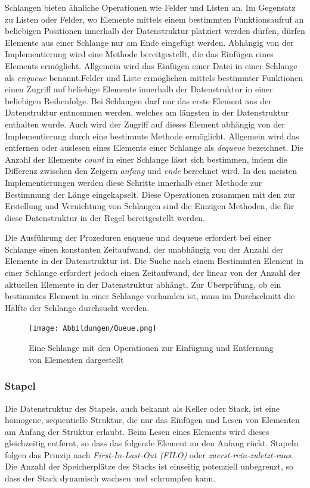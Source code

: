 Schlangen bieten ähnliche Operationen wie Felder und Listen an. Im Gegensatz zu Listen oder Felder, wo Elemente mittels einem bestimmten Funktionsaufruf an beliebigen Positionen innerhalb der Datenstruktur platziert werden dürfen, dürfen Elemente aus einer Schlange nur am Ende eingefügt werden. Abhängig von der Implementierung wird eine Methode bereitgestellt, die das Einfügen eines Elements ermöglicht. Allgemein wird das Einfügen einer Datei in einer Schlange als \textit{enqueue} benannt.Felder und Liste ermöglichen mittels bestimmter Funktionen einen Zugriff auf beliebige Elemente innerhalb der Datenstruktur in einer beliebigen Reihenfolge. Bei Schlangen darf nur das erste Element aus der Datenstruktur entnommen werden, welches am längsten in der Datenstruktur enthalten wurde. Auch wird der Zugriff auf dieses Element abhängig von der Implementierung durch eine bestimmte Methode ermöglicht. Allgemein wird das entfernen oder auslesen eines Elements einer Schlange als \textit{dequeue} bezeichnet. Die Anzahl der Elemente \textit{count} in einer Schlange lässt sich bestimmen, indem die Differenz zwischen den Zeigern \textit{anfang} und \textit{ende} berechnet wird. In den meisten Implementierungen werden diese Schritte innerhalb einer Methode zur Bestimmung der Länge eingekapselt. Diese Operationen zusammen mit den zur Erstellung und Vernichtung von Schlangen sind die Einzigen Methoden, die für diese Datenstruktur in der Regel bereitgestellt werden. \autocite[71-72]{hubwieser_fundamente_2015} \autocite[371]{gumm_band_2016}

Die Ausführung der Prozeduren enqueue und dequeue erfordert bei einer Schlange einen konstanten Zeitaufwand, der unabhängig von der Anzahl der Elemente in der Datenstruktur ist. Die Suche nach einem Bestimmten Element in einer Schlange erfordert jedoch einen Zeitaufwand, der linear von der Anzahl der aktuellen Elemente in der Datenstruktur abhängt. Zur Überprüfung, ob ein bestimmtes Element in einer Schlange vorhanden ist, muss im Durchschnitt die Hälfte der Schlange durchsucht werden. \autocite[318]{hoffmann_einfuhrung_2011}

\begin{figure}[t]
	\texttt{[image: Abbildungen/Queue.png]}
	\centering
	\caption{Eine Schlange mit den Operationen zur Einfügung und Entfernung von Elementen dargestellt \autocite[371]{gumm_band_2016}}
	\label{fig: queue}
\end{figure}

\subsubsection{Stapel}
Die Datenstruktur des Stapels, auch bekannt als Keller oder Stack, ist eine homogene, sequentielle Struktur, die nur das Einfügen und Lesen von Elementen am Anfang der Struktur erlaubt. Beim Lesen eines Elements wird dieses gleichzeitig entfernt, so dass das folgende Element an den Anfang rückt. Stapeln folgen das Prinzip nach \textit{First-In-Last-Out (FILO)} oder \textit{zuerst-rein-zuletzt-raus}. Die Anzahl der Speicherplätze des Stacks ist einseitig potenziell unbegrenzt, so dass der Stack dynamisch wachsen und schrumpfen kann. \autocite[614]{ernst_grundkurs_2020}

